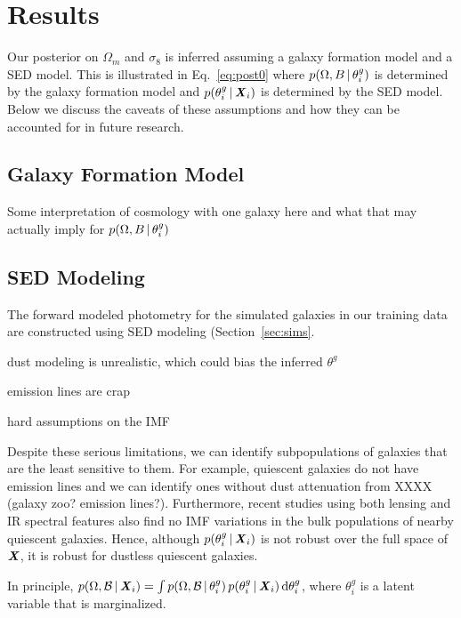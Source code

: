\section{Results} \label{sec:results}




Our posterior on $\Omega_m$ and $\sigma_8$ is inferred assuming a galaxy
formation model and a SED model. 
This is illustrated in Eq.~\ref{eq:post0} where $p(\Omega, B\,|\,\theta^g_i)$
is determined by the galaxy formation model and
$p(\theta^g_i\,|\, {\textbf{\textit{X}}}_i)$ is determined by the SED model.  
Below we discuss the caveats of these assumptions and how they can be accounted
for in future research.

\subsection{Galaxy Formation Model} \label{sec:galmodel}
Some interpretation of cosmology with one galaxy here and what that may
actually imply for $p(\Omega, B\,|\,\theta^g_i)$


\subsection{SED Modeling} \label{sec:sed}
The forward modeled photometry for the simulated galaxies in our training data
are constructed using SED modeling (Section~\ref{sec:sims}. 

dust modeling is unrealistic, which could bias the inferred $\theta^g$

emission lines are crap

hard assumptions on the IMF

Despite these serious limitations, we can identify subpopulations of galaxies
that are the least sensitive to them.
For example, quiescent galaxies do not have emission lines and we can identify
ones without dust attenuation from XXXX (galaxy zoo? emission lines?).  
Furthermore, recent studies using both lensing and IR spectral features also
find no IMF variations in the bulk populations of nearby quiescent galaxies. 
Hence, although $p(\theta^g_i\,|\, {\textbf{\textit{X}}}_i)$ is not robust over the full
space of ${\textbf{\textit{X}}}$, it is robust for dustless quiescent galaxies.

In principle, $p(\Omega, \mathcal{B}\,|\, {\textbf{\textit{X}}_i}) = \int p(\Omega,
\mathcal{B}\,|\, \theta^g_i)\,p(\theta^g_i \,|\, {\textbf{\textit{X}}_i})\,{\rm
d}\theta^g_i$, where $\theta^g_i$ is a latent variable that is marginalized. 
